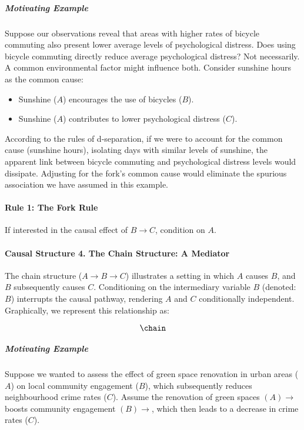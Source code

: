 \documentclass[
  singlecolumn]{article}
\let\oldparagraph\paragraph
\renewcommand{\paragraph}[1]{\oldparagraph{#1}\mbox{}}
\let\oldsubparagraph\subparagraph
\renewcommand{\subparagraph}[1]{\oldsubparagraph{#1}\mbox{}}
\providecommand{\tightlist}{%
  \setlength{\itemsep}{0pt}\setlength{\parskip}{0pt}}\usepackage{longtable,booktabs,array}
\begin{document}
\subparagraph{Motivating Example}\label{motivating-example}

Suppose our observations reveal that areas with higher rates of bicycle
commuting also present lower average levels of psychological distress.
Does using bicycle commuting directly reduce average psychological
distress? Not necessarily. A common environmental factor might influence
both. Consider sunshine hours as the common cause:

\begin{itemize}
\tightlist
\item
  Sunshine (\(A\)) encourages the use of bicycles (\(B\)).
\item
  Sunshine (\(A\)) contributes to lower psychological distress (\(C\)).
\end{itemize}

According to the rules of d-separation, if we were to account for the
common cause (sunshine hours), isolating days with similar levels of
sunshine, the apparent link between bicycle commuting and psychological
distress levels would dissipate. Adjusting for the fork's common cause
would eliminate the spurious association we have assumed in this
example.

\paragraph{Rule 1: The Fork Rule}\label{sec-four-rules}

If interested in the causal effect of \(B \to C\), condition on
\(\boxed{A}\).

\paragraph{Causal Structure 4. The Chain Structure: A
Mediator}\label{causal-structure-4.-the-chain-structure-a-mediator}

The chain structure (\(A \rightarrow B \rightarrow C\)) illustrates a
setting in which \(A\) causes \(B\), and \(B\) subsequently causes
\(C\). Conditioning on the intermediary variable \(B\) (denoted:
\(\boxed{B}\)) interrupts the causal pathway, rendering \(A\) and \(C\)
conditionally independent. Graphically, we represent this relationship
as:

\[\chain\]

\subparagraph{Motivating Example}\label{motivating-example-1}

Suppose we wanted to assess the effect of green space renovation in
urban areas (\(A\)) on local community engagement (\(B\)), which
subsequently reduces neighbourhood crime rates (\(C\)). Assume the
renovation of green spaces \((A) \rightarrow\) boosts community
engagement \((B) \rightarrow\), which then leads to a decrease in crime
rates (\(C\)).
\end{document}
